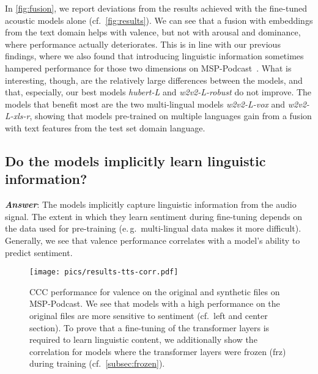 \documentclass{article}
\newcommand\hlarge{\mbox{\emph{hubert-L}}}
\newcommand\wrobust{\mbox{\emph{w2v2-L-robust}}}
\newcommand\wvox{\mbox{\emph{w2v2-L-vox}}}
\newcommand\wxlsr{\mbox{\emph{w2v2-L-xls-r}}}
\newcommand\msppodcast{\mbox{MSP-Podcast}}
\newcommand{\eg}{e.\,g.\ }
\newcommand{\cf}{{cf.\ }}
\begin{document}
In \cref{fig:fusion}, we report deviations from the results achieved with the fine-tuned acoustic models alone (\cf \cref{fig:results}).
We can see that a fusion with embeddings from the text domain helps with valence, but not with arousal and dominance, where performance actually deteriorates.
This is in line with our previous findings, where we also found that introducing linguistic information sometimes hampered performance for those two dimensions on {\msppodcast}~\citep{triantafyllopoulos2021multistage}.
What is interesting, though, are the relatively large differences between the models, and that, especially, our best models {\hlarge} and {\wrobust} do not improve.
The models that benefit most are the two multi-lingual models {\wvox} and {\wxlsr}, showing that models pre-trained on multiple languages gain from a fusion with text features from the test set domain language.




\subsection{Do the models implicitly learn linguistic information?}
\label{subsec:tts}

\emph{\textbf{Answer}}:
The models implicitly capture linguistic information from the audio signal.
The extent in which they learn sentiment during fine-tuning
depends on the data used for pre-training
(\eg multi-lingual data makes it more difficult).
Generally, we see that valence performance correlates with a model's ability to predict sentiment.








\begin{figure}[t]
    \centering
    \texttt{[image: pics/results-tts-corr.pdf]}
    \caption{
        \ac{CCC} performance for valence on the original and synthetic files on {\msppodcast}.
        We see that models with a high performance on the original files are more sensitive to sentiment (\cf left and center section).
        To prove that a fine-tuning of the transformer layers is required to learn linguistic content, we additionally show the correlation for models where the transformer layers were frozen (frz) during training (\cf \cref{subsec:frozen}).
    }
    \label{fig:tts-corr}
\end{figure}
\end{document}
